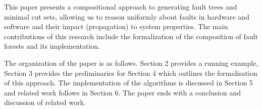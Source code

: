 
This paper presents a compositional approach to generating fault trees and minimal cut sets, allowing us to reason uniformly about faults in hardware and software and their impact (propagation) to system properties. The main contributions of this research include the formalization of the composition of fault forests and its implementation.


The organization of the paper is as follows.  Section 2 provides a running example, Section 3 provides the preliminaries for Section 4 which outlines the formalisation of this approach. The implementation of the algorithms is discussed in Section 5 and related work follows in Section 6. The paper ends with a conclusion and discussion of related work.
